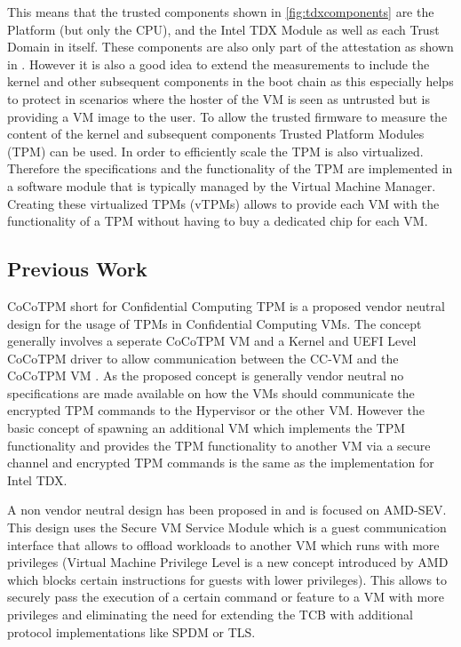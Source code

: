 \documentclass[sigplan,screen,nonacm]{acmart}
\begin{document}
This means that the trusted components shown in \cref{fig:tdxcomponents} are the Platform (but only the CPU), and the Intel TDX Module as well as each Trust Domain in itself.
These components are also only part of the attestation as shown in \cite{CA-KVM}.
However it is also a good idea to extend the measurements to include the kernel and other subsequent components in the boot chain as this especially helps to protect in scenarios where the hoster of the VM is seen as untrusted but is providing a VM image to the user.
To allow the trusted firmware to measure the content of the kernel and subsequent components Trusted Platform Modules (TPM) can be used.
In order to efficiently scale the TPM is also virtualized.
Therefore the specifications and the functionality of the TPM are implemented in a software module that is typically managed by the Virtual Machine Manager.
Creating these virtualized TPMs (vTPMs) allows to provide each VM with the functionality of a TPM without having to buy a dedicated chip for each VM.

\subsection{Previous Work}
CoCoTPM short for Confidential Computing TPM is a proposed vendor neutral design for the usage of TPMs in Confidential Computing VMs.
The concept generally involves a seperate CoCoTPM VM and a Kernel and UEFI Level CoCoTPM driver to allow communication between the CC-VM and the CoCoTPM VM \cite[3]{10.1145/3564625.3564648}.
As the proposed concept is generally vendor neutral no specifications are made available on how the VMs should communicate the encrypted TPM commands to the Hypervisor or the other VM.
However the basic concept of spawning an additional VM which implements the TPM functionality and provides the TPM functionality to another VM via a secure channel and encrypted TPM commands is the same as the implementation for Intel TDX.

A non vendor neutral design has been proposed in \cite{10.1145/3627106.3627112} and is focused on AMD-SEV.
This design uses the Secure VM Service Module which is a guest communication interface that allows to offload workloads to another VM which runs with more privileges (Virtual Machine Privilege Level is a new concept introduced by AMD which blocks certain instructions for guests with lower privileges).
This allows to securely pass the execution of a certain command or feature to a VM with more privileges and eliminating the need for extending the TCB with additional protocol implementations like SPDM or TLS.
\end{document}
